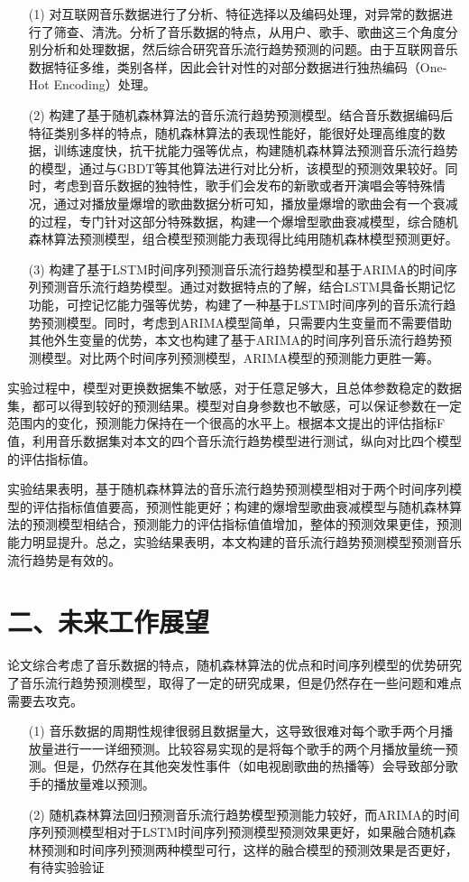\begin{conclusions}
\begin{itemize}
    \item[(1)] {对互联网音乐数据进行了分析、特征选择以及编码处理，对异常的数据进行了筛查、清洗。分析了音乐数据的特点，从用户、歌手、歌曲这三个角度分别分析和处理数据，然后综合研究音乐流行趋势预测的问题。由于互联网音乐数据特征多维，类别各样，因此会针对性的对部分数据进行独热编码（One-Hot Encoding）处理。}
    \item[(2)] {构建了基于随机森林算法的音乐流行趋势预测模型。结合音乐数据编码后特征类别多样的特点，随机森林算法的表现性能好，能很好处理高维度的数据，训练速度快，抗干扰能力强等优点，构建随机森林算法预测音乐流行趋势的模型，通过与GBDT等其他算法进行对比分析，该模型的预测效果较好。同时，考虑到音乐数据的独特性，歌手们会发布的新歌或者开演唱会等特殊情况，通过对播放量爆增的歌曲数据分析可知，播放量爆增的歌曲会有一个衰减的过程，专门针对这部分特殊数据，构建一个爆增型歌曲衰减模型，综合随机森林算法预测模型，组合模型预测能力表现得比纯用随机森林模型预测更好。}
    \item[(3)] {构建了基于LSTM时间序列预测音乐流行趋势模型和基于ARIMA的时间序列预测音乐流行趋势模型。通过对数据特点的了解，结合LSTM具备长期记忆功能，可控记忆能力强等优势，构建了一种基于LSTM时间序列的音乐流行趋势预测模型。同时，考虑到ARIMA模型简单，只需要内生变量而不需要借助其他外生变量的优势，本文也构建了基于ARIMA的时间序列音乐流行趋势预测模型。对比两个时间序列预测模型，ARIMA模型的预测能力更胜一筹。}
\end{itemize}

实验过程中，模型对更换数据集不敏感，对于任意足够大，且总体参数稳定的数据集，都可以得到较好的预测结果。模型对自身参数也不敏感，可以保证参数在一定范围内的变化，预测能力保持在一个很高的水平上。根据本文提出的评估指标F值，利用音乐数据集对本文的四个音乐流行趋势模型进行测试，纵向对比四个模型的评估指标值。

实验结果表明，基于随机森林算法的音乐流行趋势预测模型相对于两个时间序列模型的评估指标值值要高，预测性能更好；构建的爆增型歌曲衰减模型与随机森林算法的预测模型相结合，预测能力的评估指标值值增加，整体的预测效果更佳，预测能力明显提升。总之，实验结果表明，本文构建的音乐流行趋势预测模型预测音乐流行趋势是有效的。
\section*{二、未来工作展望}
论文综合考虑了音乐数据的特点，随机森林算法的优点和时间序列模型的优势研究了音乐流行趋势预测模型，取得了一定的研究成果，但是仍然存在一些问题和难点需要去攻克。
\begin{itemize}
    \item[(1)]  {音乐数据的周期性规律很弱且数据量大，这导致很难对每个歌手两个月播放量进行一一详细预测。比较容易实现的是将每个歌手的两个月播放量统一预测。但是，仍然存在其他突发性事件（如电视剧歌曲的热播等）会导致部分歌手的播放量难以预测。}
    \item[(2)]  {随机森林算法回归预测音乐流行趋势模型预测能力较好，而ARIMA的时间序列预测模型相对于LSTM时间序列预测模型预测效果更好，如果融合随机森林预测和时间序列预测两种模型可行，这样的融合模型的预测效果是否更好，有待实验验证}
\end{itemize}


\end{conclusions}

